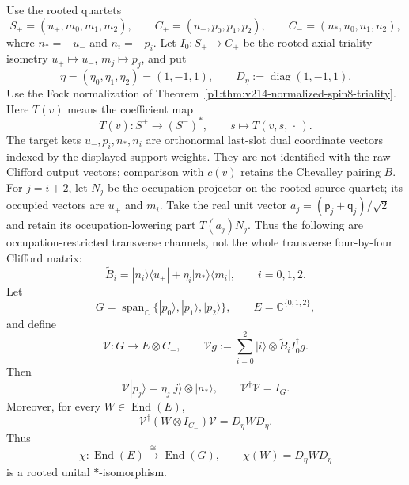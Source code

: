 \documentclass[11pt]{article}
\begin{document}
\begin{theorem}
\label{p1:thm:v567-signed-triality-channel-family}
Use the rooted quartets
\[
 S_+=(u_+,m_0,m_1,m_2),\qquad
 C_+=(u_-,p_0,p_1,p_2),\qquad
 C_-=(n_*,n_0,n_1,n_2),
\]
where $n_*=-u_-$ and $n_i=-p_i$.  Let
$I_0:S_+\to C_+$ be the rooted axial triality isometry
$u_+\mapsto u_-$, $m_j\mapsto p_j$, and put
\[
 \eta=(\eta_0,\eta_1,\eta_2)=(1,-1,1),
 \qquad
 D_\eta:=\operatorname{diag}(1,-1,1).
\]
Use the Fock normalization of
Theorem~\ref{p1:thm:v214-normalized-spin8-triality}.
Here \(T(v)\) means the coefficient map
\[
 T(v):S^+\longrightarrow(S^-)^*,\qquad
             s\longmapsto T(v,s,\,\cdot\,).
\]
The target kets \(u_-,p_i,n_*,n_i\) are orthonormal last-slot
dual coordinate vectors indexed by the displayed support weights.
They are not identified with the raw Clifford output vectors;
comparison with \(c(v)\) retains the Chevalley pairing \(B\).
For \(j=i+2\), let \(N_j\) be the occupation projector on the rooted
source quartet; its occupied vectors are \(u_+\) and \(m_i\).
Take the real unit vector \(a_j=(\mathsf p_j+\mathsf q_j)/\sqrt2\) and retain its
occupation-lowering part \(T(a_j)N_j\).
Thus the following are occupation-restricted transverse channels,
not the whole transverse four-by-four Clifford matrix:
\[
 \widetilde B_i
 =|n_i\rangle\langle u_+|
  +\eta_i|n_*\rangle\langle m_i|,
 \qquad i=0,1,2.
\]
Let
\[
 G=\operatorname{span}_{\mathbb C}\{|p_0\rangle,|p_1\rangle,|p_2\rangle\},
 \qquad E=\mathbb C^{\{0,1,2\}},
\]
and define
\[
 \mathcal V:G\longrightarrow E\otimes C_-,\qquad
 \mathcal Vg:=\sum_{i=0}^2|i\rangle\otimes
 \widetilde B_i I_0^\dagger g.
\]
Then
\[
 \boxed{\mathcal V|p_j\rangle
 =\eta_j|j\rangle\otimes|n_*\rangle,\qquad
 \mathcal V^\dagger\mathcal V=I_G.}
\]
Moreover, for every $W\in\operatorname{End}(E)$,
\[
 \boxed{
 \mathcal V^\dagger(W\otimes I_{C_-})\mathcal V
 =D_\eta W D_\eta.}
\]
Thus
\[
 \boxed{
 \chi:\operatorname{End}(E)\xrightarrow{\ \cong\ }\operatorname{End}(G),
 \qquad \chi(W)=D_\eta W D_\eta}
\]
is a rooted unital $*$-isomorphism.
\end{theorem}
\end{document}
